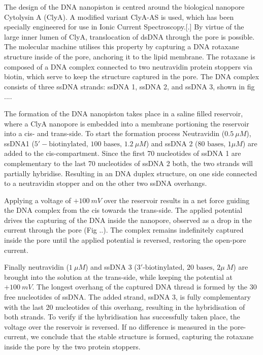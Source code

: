 The design of the DNA nanopiston is centred around the biological nanopore Cytolysin
A (ClyA). A modified variant ClyA-AS is used, which has been specially engineered for
use in Ionic Current Spectroscopy.[.] By virtue of the large inner lumen of ClyA,
translocation of dsDNA through the pore is possible. The molecular machine utilises this
property by capturing a DNA rotaxane structure inside of the pore, anchoring it to the
lipid membrane. The rotaxane is composed of a DNA complex connected to two neutravidin
protein stoppers via biotin, which serve to keep the structure captured in the pore. The
DNA complex consists of three ssDNA strands: ssDNA 1, ssDNA 2, and ssDNA 3, shown in fig
....

The formation of the DNA nanopiston takes place in a saline filled reservoir, where a
ClyA nanopore is embedded into a membrane portioning the reservoir into a cis- and
trans-side. To start the formation process Neutravidin ($0.5\ \mu M$), ssDNA1
($5′-\text{biotinylated, }100\text{ bases, }1.2\ \mu M$) and ssDNA 2 ($80\text{ bases, }1
\mu M$) are added to the cis-compartment. Since the first 70 nucleotides of ssDNA 1 are
complementary to the last 70 nucleotides of ssDNA 2 both, the two strands will partially
hybridise. Resulting in an DNA duplex structure, on one side connected to a
neutravidin stopper and on the other two ssDNA overhangs.

Applying a voltage of $+100\ mV$ over the reservoir results in a net force guiding the
DNA complex from the cis towards the trans-side. The applied potential drives the
capturing of the DNA inside the nanopore, observed as a drop in the current through the
pore (Fig ..). The complex remains indefinitely captured inside the pore until the
applied potential is reversed, restoring the open-pore current.

Finally neutravidin ($1\ \mu M$) and ssDNA 3 ($3\text{′-biotinylated, }20\text{ bases, }2
\mu\ M$) are brought into the solution at the trans-side, while keeping the potential at
$+ 100\ mV$. The longest overhang of the captured DNA thread is formed by the 30 free
nucleotides of ssDNA. The added strand, ssDNA 3, is fully complementary with the last 20
nucleotides of this overhang, resulting in the hybridisation of both strands. To verify
if the hybridisation has successfully taken place, the voltage over the reservoir is
reversed. If no difference is measured in the pore-current, we conclude that the stable
structure is formed, capturing the rotaxane inside the pore by the two protein stoppers.


